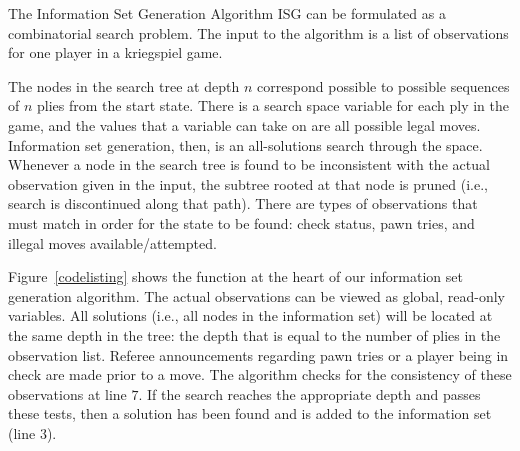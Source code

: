 \documentclass[times, 10pt,twocolumn]{article}
\begin{document}

   
{The Information Set Generation Algorithm}
ISG can be formulated as a combinatorial search problem.  The input to the algorithm is a list
of observations for one player in a kriegspiel game.    

The nodes in the search tree at depth $n$ correspond possible to possible sequences of $n$ plies from the start state.
There is a search space variable for each ply in the game, and the values that a variable can take on are all possible
legal moves.  Information set generation, then, is an all-solutions search through the space.  Whenever a node in the search tree is
found to be inconsistent with the actual observation given in the input, the
subtree rooted at that node is pruned (i.e., search is discontinued along that
path).  There are types of observations that must match in order for the state
to be found: check status, pawn tries, and illegal moves available/attempted.

Figure~\ref{codelisting} shows the function at the heart of our information set generation algorithm.  The actual
observations can be viewed as global, read-only variables.  All solutions (i.e., all nodes in the information set) will
be located at the same depth in the tree: the depth that is equal to the number of plies in the observation list.
Referee announcements regarding pawn tries or a player being in check are made prior to a move.  The algorithm checks
for the consistency of these observations at line $7$.  If the search reaches the appropriate depth and passes these
tests, then a solution has been found and is added to the information set (line $3$).  
\end{document}
